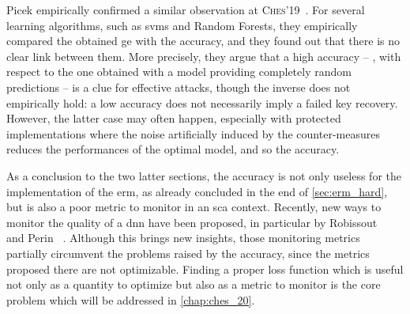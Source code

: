 Picek \etal{} empirically confirmed a similar observation at \textsc{Ches}'19~\cite{picek_curse_2019}.
For several learning algorithms, such as \glspl{svm} and Random Forests, they empirically compared the obtained \gls{ge} with the accuracy, and they found out that there is no clear link between them.
More precisely, they argue that a high accuracy -- \ie{}, with respect to the one obtained with a model providing completely random predictions -- is a clue for effective attacks, though the inverse does not empirically hold: a low accuracy does not necessarily imply a failed key recovery.
However, the latter case may often happen, especially with protected implementations where the noise artificially induced by the counter-measures reduces the performances of the optimal model, and so the accuracy.

As a conclusion to the two latter sections, the accuracy is not only useless for the implementation of the \gls{erm}, as already concluded in the end of \autoref{sec:erm_hard}, but is also a poor metric to monitor in an \gls{sca} context.
Recently, new ways to monitor the quality of a \gls{dnn} have been proposed, in particular by Robissout \etal{}~\cite{robissout_online_2020} and Perin \etal{}~\cite{perin_learning_2020}.
Although this brings new insights, those monitoring metrics partially circumvent the problems raised by the accuracy, since the metrics proposed there are not optimizable.
Finding a proper loss function which is useful not only as a quantity to optimize but also as a metric to monitor is the core problem which will be addressed in \autoref{chap:ches_20}.